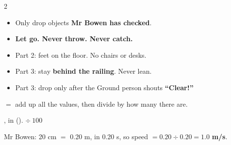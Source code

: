 \documentclass[12pt,a4paper]{article}
\begin{document}
\begin{safety}
  \small
  \begin{multicols}{2}
  \begin{itemize}[itemsep=1pt, topsep=0pt]
    \item Only drop objects \textbf{Mr Bowen has checked}.
    \item \textbf{Let go. Never throw. Never catch.}
    \item Part 2: feet on the floor. No chairs or desks.
    \columnbreak
    \item Part 3: stay \textbf{behind the railing}. Never lean.
    \item Part 3: drop only after the Ground person shouts \textbf{``Clear!''}
  \end{itemize}
  \end{multicols}
\end{safety}

\begin{remember}
   $=$ add up all the values, then divide by how many there are.

  \vspace{3pt}
  , in  ().
  \quad {} $\div\ 100$

  \vspace{3pt}
  Mr Bowen: 20 cm $=$ 0.20 m, in 0.20 s, so speed $= 0.20 \div 0.20 =
  \mathbf{1.0}$ \textbf{m/s}.
\end{remember}

\end{document}
